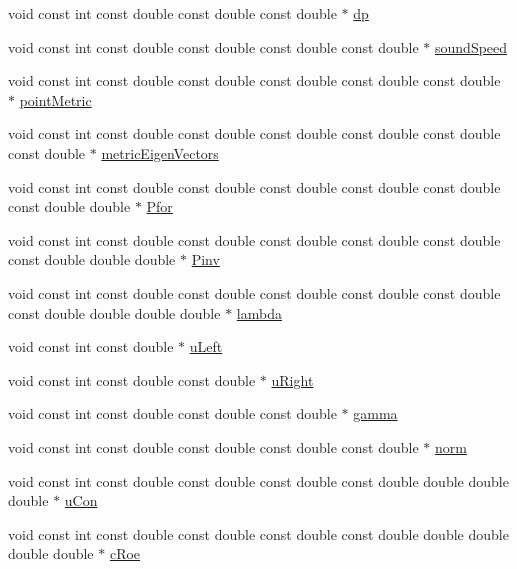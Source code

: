 \begin{DoxyCompactItemize}
\item 
void const int const double const double const double $\ast$ \hyperlink{RoeKernels_8H_ac12401cc24ddbf8b003a0e6201826e90}{dp}
\item 
void const int const double const double const double const double $\ast$ \hyperlink{RoeKernels_8H_ab66f723f3c3d8399c4428802a1142be0}{sound\+Speed}
\item 
void const int const double const double const double const double const double $\ast$ \hyperlink{RoeKernels_8H_a3ef779535ff22c94cec7a43794047e9d}{point\+Metric}
\item 
void const int const double const double const double const double const double const double $\ast$ \hyperlink{RoeKernels_8H_abc719b26d5e9b9d4a4f40ad4261c5f70}{metric\+Eigen\+Vectors}
\item 
void const int const double const double const double const double const double const double double $\ast$ \hyperlink{RoeKernels_8H_a15dafdc1823a1c1281057d840bfdcda6}{Pfor}
\item 
void const int const double const double const double const double const double const double double double $\ast$ \hyperlink{RoeKernels_8H_a399ec13188834ab2fbeb1b2e02def95d}{Pinv}
\item 
void const int const double const double const double const double const double const double double double double $\ast$ \hyperlink{RoeKernels_8H_a89211c91f7e80725e4791ef58e043244}{lambda}
\item 
void const int const double $\ast$ \hyperlink{RoeKernels_8H_a6d30a232f8df207a0a3655c728f0c396}{u\+Left}
\item 
void const int const double const double $\ast$ \hyperlink{RoeKernels_8H_ad7596a27f3010967e23b245f06eadfdd}{u\+Right}
\item 
void const int const double const double const double $\ast$ \hyperlink{RoeKernels_8H_aa94841cd8b113b2af1e594fe6b13c9ee}{gamma}
\item 
void const int const double const double const double const double $\ast$ \hyperlink{RoeKernels_8H_a2f4a1dd2ebbf44fdb86ecebd7a4c2d0d}{norm}
\item 
void const int const double const double const double const double double double double $\ast$ \hyperlink{RoeKernels_8H_afbfc1812dadf64d47879e3085e3dd1d0}{u\+Con}
\item 
void const int const double const double const double const double double double double double $\ast$ \hyperlink{RoeKernels_8H_a333c205cc8e2644d5201ac7099775c88}{c\+Roe}
\item 

\end{DoxyCompactItemize}
